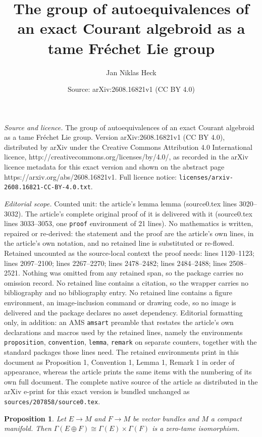 \documentclass[10pt,a4paper]{amsart}
\title{The group of autoequivalences of an exact Courant algebroid as a tame Fréchet Lie group}
\author{Jan Niklas Heck}
\date{Source: arXiv:2608.16821v1 (CC BY 4.0)}
\newtheorem{proposition}{Proposition}
\begin{document}
\maketitle

\noindent\emph{Source and licence.} The group of autoequivalences of an exact Courant algebroid as a tame Fréchet Lie group. Version arXiv:2608.16821v1 (CC BY 4.0), distributed by arXiv under the Creative Commons Attribution 4.0 International licence, http://creativecommons.org/licenses/by/4.0/, as recorded in the arXiv licence metadata for this exact version and shown on the abstract page https://arxiv.org/abs/2608.16821v1. Full licence notice: \texttt{licenses/arxiv-2608.16821-CC-BY-4.0.txt}.\par\smallskip

\noindent\textit{Editorial scope.} Counted unit: the article's lemma lemma (source0.tex lines 3020--3032). The article's complete original proof of it is delivered with it (source0.tex lines 3033--3053, one \texttt{proof} environment of 21 lines). No mathematics is written, repaired or re-derived: the statement and the proof are the article's own lines, in the article's own notation, and no retained line is substituted or re-flowed.  Retained uncounted as the source-local context the proof needs: lines 1120--1123; lines 2097--2100; lines 2267--2270; lines 2478--2482; lines 2484--2488; lines 2508--2521.  Nothing was omitted from any retained span, so the package carries no omission record.  No retained line contains a citation, so the wrapper carries no bibliography and no bibliography entry.  No retained line contains a figure environment, an image-inclusion command or drawing code, so no image is delivered and the package declares no asset dependency.  Editorial formatting only, in addition: an AMS \texttt{amsart} preamble that restates the article's own declarations and macros used by the retained lines, namely the environments \texttt{proposition}, \texttt{convention}, \texttt{lemma}, \texttt{remark} on separate counters, together with the standard packages those lines need.  The retained environments print in this document as Proposition 1, Convention 1, Lemma 1, Remark 1 in order of appearance, whereas the article prints the same items with the numbering of its own full document.  The complete native source of the article as distributed in the arXiv e-print for this exact version is bundled unchanged as \texttt{sources/207858/source0.tex}.
\begin{proposition}
\label{Prop:EplusFsect}
Let $E\to M$ and $F\to M$ be vector bundles and $M$ a compact manifold. Then $\Gamma(E\oplus F)\cong\Gamma(E)\times\Gamma(F)$ is a zero-tame isomorphism.
\end{proposition}
\end{document}
